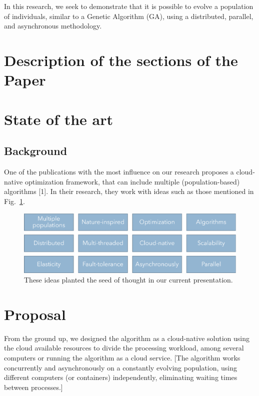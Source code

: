 \documentclass[runningheads]{llncs}
\begin{document}
In this research, we seek to demonstrate that it is possible to evolve a
population of individuals, similar to a Genetic Algorithm (GA), using a
distributed, parallel, and asynchronous methodology.



\section{Description of the sections of the Paper} 

\section{State of the art} 

\subsection{Background}

One of the publications with the most influence on our research proposes a
cloud-native optimization framework, that can include multiple
(population-based) algorithms [1]. In their research, they work with ideas such
as those mentioned in Fig.~\ref{fig1}.

\begin{figure}
    \includegraphics[width=\textwidth]{img/fig1_background.pdf}
    \caption{These ideas planted the seed of thought in our current presentation.} \label{fig1}
    \end{figure}

\section{Proposal} 

From the ground up, we designed the algorithm as a cloud-native solution using
the cloud available resources to divide the processing workload, among several
computers or running the algorithm as a cloud service. [The algorithm works
concurrently and asynchronously on a constantly evolving population, using
different computers (or containers) independently, eliminating waiting times
between processes.]
\end{document}
